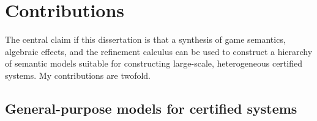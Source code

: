 \documentclass[draft,11pt]{report}
\begin{document}
%
%


\section{Contributions} %
\label{ssec:contrib}

The central claim if this dissertation is that a synthesis
of %
game semantics, algebraic effects, and the refinement calculus
can be used to construct a hierarchy of semantic models
suitable for constructing large-scale, heterogeneous certified systems.
My contributions are twofold.

\subsection{General-purpose models for certified systems} %
\end{document}
